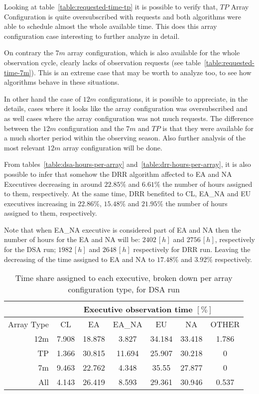 Looking at table~\ref{table:requested-time-tp} it is possible to verify that, $TP$ Array Configuration is quite oversubscribed with requests and both algorithms were able to schedule almost the whole available time. This does this array configuration case interesting to further analyze in detail. 

On contrary the $7m$ array configuration, which is also available for the whole observation cycle, clearly lacks of observation requests (see table~\ref{table:requested-time-7m}). This is an extreme case that may be worth to analyze too, to see how algorithms behave in these situations.

In other hand the case of $12m$ configurations, it is possible to appreciate, in the details, cases where it looks like the array configuration was oversubscribed and as well cases where the array configuration was not much requests. The difference between the $12m$ configuration and the $7m$ and $TP$ is that they were available for a much shorter period within the observing season. Also further analysis of the most relevant $12m$ array configuration will be done.

From tables~\ref{table:dsa-hours-per-array} and~\ref{table:drr-hours-per-array}, it is also possible to infer that somehow the DRR algorithm affected to EA and NA Executives decreasing in around $22.85\%$ and $6.61\%$ the number of hours assigned to them, respectively. At the same time, DRR benefited to CL, EA\_NA and EU executives increasing in $22.86\%$, $15.48\%$ and $21.95\%$ the number of hours assigned to them, respectively.

Note that when EA\_NA executive is considered part of EA and NA then the number of hours for the EA and NA will be: $2402\,[h]$ and $2756\,[h]$, respectively for the DSA run; $1982\,[h]$ and $2648\,[h]$ respectively for DRR run. Leaving the decreasing of the time assigned to EA and NA to $17.48\%$ and $3.92\%$ respectively.  

\begin{table}[t]
\centering
\begin{tabular}{c|c|c|c|c|c|c|} 
\cline{2-7}
 & \multicolumn{6}{c|}{Executive observation time $[\%]$} \\ \hline
\multicolumn{1}{|r|}{Array Type} & CL	& EA & EA\_NA &	EU & NA & OTHER \\ \hline
\multicolumn{1}{|r|}{12m} & 7.908 & 18.878 & 3.827 & 34.184 & 33.418 & 1.786 \\ \hline
\multicolumn{1}{|r|}{TP} & 1.366 & 30.815 & 11.694 & 25.907 & 30.218 & 0 \\ \hline
\multicolumn{1}{|r|}{7m} & 9.463 & 22.762 & 4.348 & 35.55 & 27.877 & 0 \\ \hline
\multicolumn{1}{|r|}{All} & 4.143 & 26.419 & 8.593 & 29.361 & 30.946 & 0.537 \\ \hline
\end{tabular}
\caption{Time share assigned to each executive, broken down per array configuration type, for DSA run}
\label{table:dsa-percentage-per-array}
\end{table}

